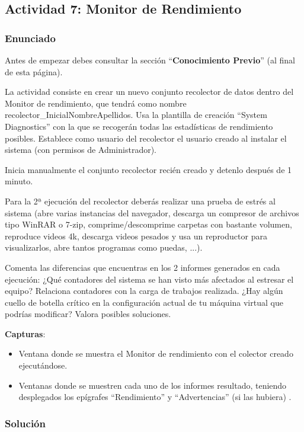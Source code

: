 \subsection{Actividad 7: Monitor de Rendimiento}

\subsubsection{Enunciado}
Antes de empezar debes consultar la sección ``\textbf{Conocimiento Previo}'' (al final de esta página).

La actividad consiste en crear un nuevo conjunto recolector de datos dentro del Monitor de rendimiento, que tendrá como nombre recolector\_InicialNombreApellidos. Usa la plantilla de creación ``System Diagnostics'' con la que se recogerán todas las estadísticas de rendimiento posibles. Establece como usuario del recolector el usuario creado al instalar el sistema (con permisos de Administrador).

Inicia manualmente el conjunto recolector recién creado y detenlo después de 1 minuto.

Para la 2ª ejecución del recolector deberás realizar una prueba de estrés al sistema (abre varias instancias del navegador, descarga un compresor de archivos tipo WinRAR o 7-zip, comprime/descomprime carpetas con bastante volumen, reproduce videos 4k, descarga videos pesados y usa un reproductor para visualizarlos, abre tantos programas como puedas, ...).

Comenta las diferencias que encuentras en los 2 informes generados en cada ejecución: ¿Qué contadores del sistema se han visto más afectados al estresar el equipo? Relaciona contadores con la carga de trabajos realizada. ¿Hay algún cuello de botella crítico en la configuración actual de tu máquina virtual que podrías modificar? Valora posibles soluciones.

\textbf{Capturas}:
\begin{itemize}
    \item Ventana donde se muestra el Monitor de rendimiento con el colector creado ejecutándose.
    \item Ventanas donde se muestren cada uno de los informes resultado, teniendo desplegados los epígrafes ``Rendimiento'' y ``Advertencias'' (si las hubiera) .
\end{itemize}

\subsubsection{Solución}

